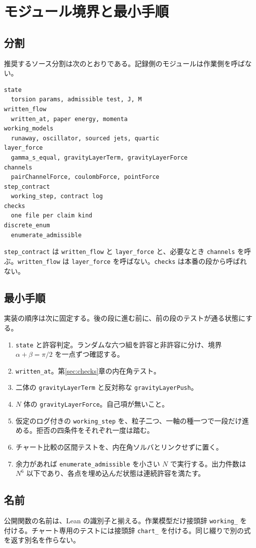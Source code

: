 \section{モジュール境界と最小手順}
\label{sec:modules}

\subsection{分割}

推奨するソース分割は次のとおりである。記録側のモジュールは作業側を呼ばない。

\begin{verbatim}
state
  torsion params, admissible test, J, M
written_flow
  written_at, paper energy, momenta
working_models
  runaway, oscillator, sourced jets, quartic
layer_force
  gamma_s_equal, gravityLayerTerm, gravityLayerForce
channels
  pairChannelForce, coulombForce, pointForce
step_contract
  working_step, contract log
checks
  one file per claim kind
discrete_enum
  enumerate_admissible
\end{verbatim}

\texttt{step\_contract} は \texttt{written\_flow} と \texttt{layer\_force} と、必要なとき \texttt{channels} を呼ぶ。\texttt{written\_flow} は \texttt{layer\_force} を呼ばない。\texttt{checks} は本番の段から呼ばれない。

\subsection{最小手順}

実装の順序は次に固定する。後の段に進む前に、前の段のテストが通る状態にする。

\begin{enumerate}
\item \texttt{state} と許容判定。ランダムな六つ組を許容と非許容に分け、境界 \(\alpha+\beta=\pi/2\) を一点ずつ確認する。
\item \texttt{written\_at}。第\ref{sec:checks}章の内在角テスト。
\item 二体の \texttt{gravityLayerTerm} と反対称な \texttt{gravityLayerPush}。
\item \(N\) 体の \texttt{gravityLayerForce}。自己項が無いこと。
\item 仮定のログ付きの \texttt{working\_step} を、粒子二つ、一軸の種一つで一段だけ進める。拒否の四条件をそれぞれ一度は踏む。
\item チャート比較の区間テストを、内在角ソルバとリンクせずに置く。
\item 余力があれば \texttt{enumerate\_admissible} を小さい \(N\) で実行する。出力件数は \(N^6\) 以下であり、各点を埋め込んだ状態は連続許容を満たす。
\end{enumerate}

\subsection{名前}

公開関数の名前は、Lean の識別子と揃える。作業模型だけ接頭辞 \texttt{working\_} を付ける。チャート専用のテストには接頭辞 \texttt{chart\_} を付ける。同じ綴りで別の式を返す別名を作らない。
